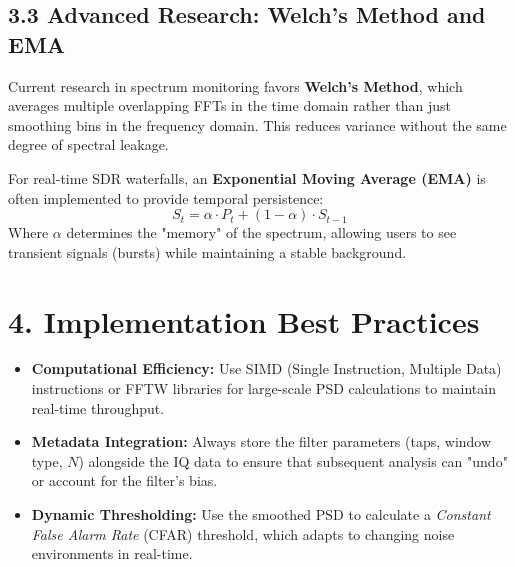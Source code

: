 \documentclass[11pt]{report}
\begin{document}
\subsection*{3.3 Advanced Research: Welch's Method and EMA}
Current research in spectrum monitoring favors \textbf{Welch’s Method}, which averages multiple overlapping FFTs in the time domain rather than just smoothing bins in the frequency domain. This reduces variance without the same degree of spectral leakage. 

For real-time SDR waterfalls, an \textbf{Exponential Moving Average (EMA)} is often implemented to provide temporal persistence:
\[
S_t = \alpha \cdot P_t + (1 - \alpha) \cdot S_{t-1}
\]
Where $\alpha$ determines the "memory" of the spectrum, allowing users to see transient signals (bursts) while maintaining a stable background.

\section*{4. Implementation Best Practices}
\begin{itemize}[leftmargin=*]
    \item \textbf{Computational Efficiency:} Use SIMD (Single Instruction, Multiple Data) instructions or FFTW libraries for large-scale PSD calculations to maintain real-time throughput.
    \item \textbf{Metadata Integration:} Always store the filter parameters (taps, window type, $N$) alongside the IQ data to ensure that subsequent analysis can "undo" or account for the filter's bias.
    \item \textbf{Dynamic Thresholding:} Use the smoothed PSD to calculate a \textit{Constant False Alarm Rate} (CFAR) threshold, which adapts to changing noise environments in real-time.
\end{itemize}
\end{document}
